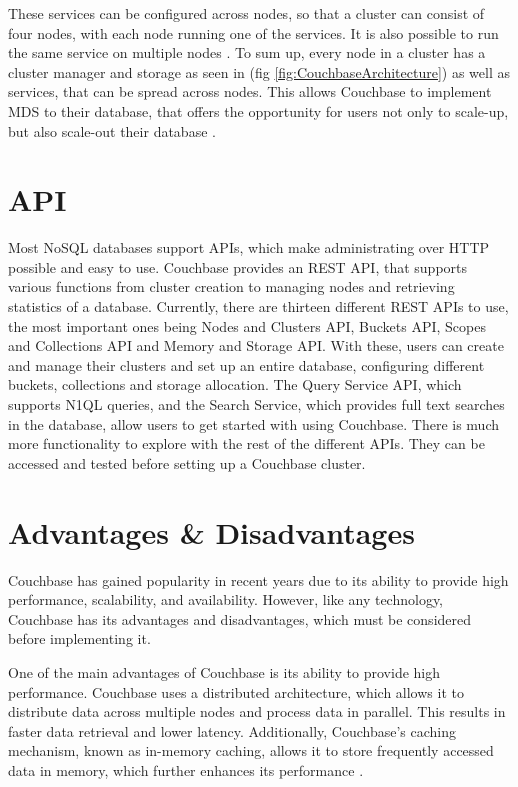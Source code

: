These services can be configured across nodes, so that a cluster can consist of four nodes, with each node running one of the services. It is also possible to run the same service on multiple nodes \parencite{CouchbaseIntroduction}.  \newline
To sum up, every node in a cluster has a cluster manager and storage as seen in (fig \ref{fig:CouchbaseArchitecture}) as well as services, that can be spread across nodes. This allows Couchbase to implement \ac{MDS} to their database, that offers the opportunity for users not only to scale-up, but also scale-out their database \parencite{CouchbasePaper}. 


\section{\ac{API}}
Most \ac{NoSQL} databases support \acp{API}, which make administrating over \ac{HTTP} possible and easy to use.\newline
Couchbase provides an \ac{REST} \ac{API}, that supports various functions from cluster creation to managing nodes and retrieving statistics of a database. Currently, there are thirteen different \ac{REST} \acp{API} to use, the most important ones being Nodes and Clusters \ac{API}, Buckets \ac{API}, Scopes and Collections \ac{API} and Memory and Storage \ac{API}. With these, users can create and manage their clusters and set up an entire database, configuring different buckets, collections and storage allocation. The Query Service \ac{API}, which supports \ac{N1QL} queries, and the Search Service, which provides full text searches in the database, allow users to get started with using Couchbase\parencite{CouchbaseAPI}. \newline
There is much more functionality to explore with the rest of the different \acp{API}. They can be accessed and tested before setting up a Couchbase cluster.


\section{Advantages \& Disadvantages}

Couchbase has gained popularity in recent years due to its ability to provide high performance, scalability, and availability. However, like any technology, Couchbase has its advantages and disadvantages, which must be considered before implementing it.

One of the main advantages of Couchbase is its ability to provide high performance. Couchbase uses a distributed architecture, which allows it to distribute data across multiple nodes and process data in parallel. This results in faster data retrieval and lower latency. Additionally, Couchbase's caching mechanism, known as in-memory caching, allows it to store frequently accessed data in memory, which further enhances its performance \parencite{Couchbase.20230414} \parencite{Couchbase.Review} \parencite{CouchbaseArchitecturalAdvantages}.

